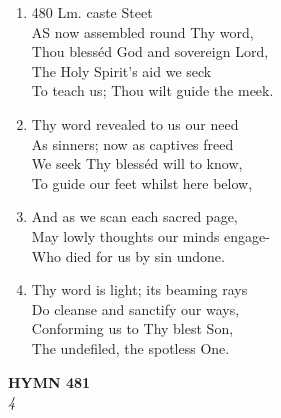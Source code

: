 \documentclass[11pt,a4paper]{article}
\begin{document}
\begin{enumerate}
    \item 480 Lm. caste Steet \\
        AS now assembled round Thy word, \\
        Thou blesséd God and sovereign Lord, \\
        The Holy Spirit's aid we seck \\
        To teach us; Thou wilt guide the meek.

    \item Thy word revealed to us our need \\
        As sinners; now as captives freed \\
        We seek Thy blesséd will to know, \\
        To guide our feet whilst here below,

    \item And as we scan each sacred page, \\
        May lowly thoughts our minds engage- \\
        Who died for us by sin undone.

    \item Thy word is light; its beaming rays \\
        Do cleanse and sanctify our ways, \\
        Conforming us to Thy blest Son, \\
        The undefiled, the spotless One.

\end{enumerate}

\newpage
\begin{center}
    {\Large \textbf{HYMN 481}}
    \\
    \textit{4}
\end{center}
\vspace{1em}
\end{document}

